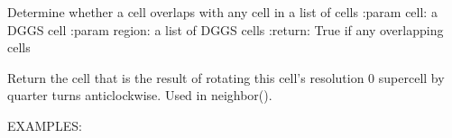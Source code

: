 \documentclass[a4paper,12ptopenany,oneside,english]{sphinxmanual}
\begin{document}
\begin{fulllineitems}
\begin{fulllineitems}
\end{fulllineitems}


\begin{fulllineitems}
\label{\detokenize{dggs:rhealpixdggs.dggs.Cell.region_overlaps}}
\pysigstartsignatures
{}
\pysigstopsignatures
\sphinxAtStartPar
Determine whether a cell overlaps with any cell in a list of cells
:param cell: a DGGS cell
:param region: a list of DGGS cells
:return: True if any overlapping cells

\end{fulllineitems}


\begin{fulllineitems}
\label{\detokenize{dggs:rhealpixdggs.dggs.Cell.rotate}}
\pysigstartsignatures
{}
\pysigstopsignatures
\sphinxAtStartPar
Return the cell that is the result of rotating this cell’s
resolution 0 supercell by  quarter turns anticlockwise.
Used in neighbor().

\sphinxAtStartPar
EXAMPLES:

\begin{sphinxVerbatim}[commandchars=\\\{\}]
   \PYG{p}{[} \PYG{p}{]}
\PYG{p}{[}    \PYG{p}{]}
\end{sphinxVerbatim}

\end{fulllineitems}


\end{fulllineitems}
\end{document}

